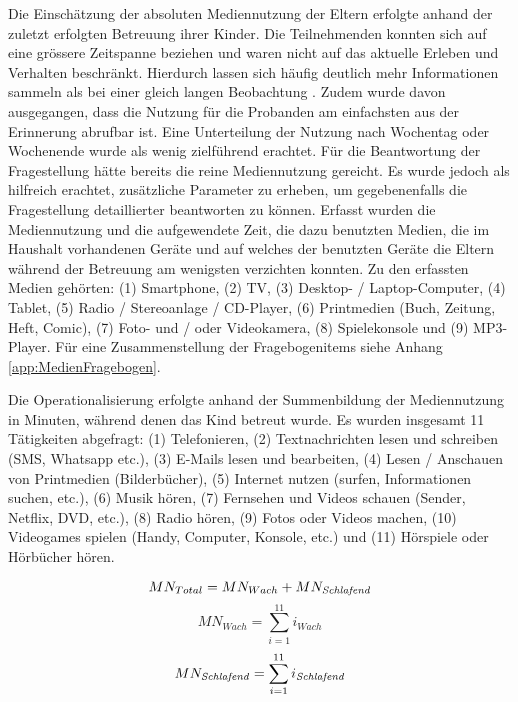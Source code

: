 Die Einschätzung der absoluten Mediennutzung der Eltern erfolgte anhand der zuletzt erfolgten Betreuung ihrer Kinder. Die Teilnehmenden konnten sich auf eine grössere Zeitspanne beziehen und waren nicht auf das aktuelle Erleben und Verhalten beschränkt. Hierdurch lassen sich häufig deutlich mehr Informationen sammeln als bei einer gleich langen Beobachtung \cite{Berk2005}. Zudem wurde davon ausgegangen, dass die Nutzung für die Probanden am einfachsten aus der Erinnerung abrufbar ist. Eine Unterteilung der Nutzung nach Wochentag oder Wochenende wurde als wenig zielführend erachtet. Für die Beantwortung der Fragestellung hätte bereits die reine Mediennutzung gereicht. Es wurde jedoch als hilfreich erachtet, zusätzliche Parameter zu erheben, um gegebenenfalls die Fragestellung detaillierter beantworten zu können. Erfasst wurden die Mediennutzung und die aufgewendete Zeit, die dazu benutzten Medien, die im Haushalt vorhandenen Geräte und auf welches der benutzten Geräte die Eltern während der Betreuung am wenigsten verzichten konnten. Zu den erfassten Medien gehörten: (1) Smartphone, (2) TV, (3) Desktop- / Laptop-Computer, (4) Tablet, (5) Radio / Stereoanlage / CD-Player, (6) Printmedien (Buch, Zeitung, Heft, Comic), (7) Foto- und / oder Videokamera, (8) Spielekonsole und (9) MP3-Player. Für eine Zusammenstellung der Fragebogenitems siehe Anhang \ref{app:MedienFragebogen}.

Die Operationalisierung erfolgte anhand der Summenbildung der Mediennutzung in Minuten, während denen das Kind betreut wurde. Es wurden insgesamt 11 Tätigkeiten abgefragt: (1) Telefonieren, (2) Textnachrichten lesen und schreiben (SMS, Whatsapp etc.), (3) E-Mails lesen und bearbeiten, (4) Lesen / Anschauen von Printmedien (Bilderbücher), (5) Internet nutzen (surfen, Informationen suchen, etc.), (6) Musik hören, (7) Fernsehen und Videos schauen (Sender, Netflix, DVD, etc.), (8) Radio hören, (9) Fotos oder Videos machen, (10) Videogames spielen (Handy, Computer, Konsole, etc.) und (11) Hörspiele oder Hörbücher hören. 

\begin{equation}\label{eq:MedienTotal}
    MN_{Total}=MN_{Wach} + MN_{\text{\textit{Schlafend}}}
\end{equation}
\begin{equation}\label{eq:MedienWach}
    MN_{Wach}=\sum_{i=1}^{11} i_{Wach}
\end{equation}
\begin{equation}\label{eq:MedienSchlafend}
    MN_{\text{\textit{Schlafend}}}=\sum_{i=1}^{11} i_{\text{\textit{Schlafend}}}
\end{equation}

